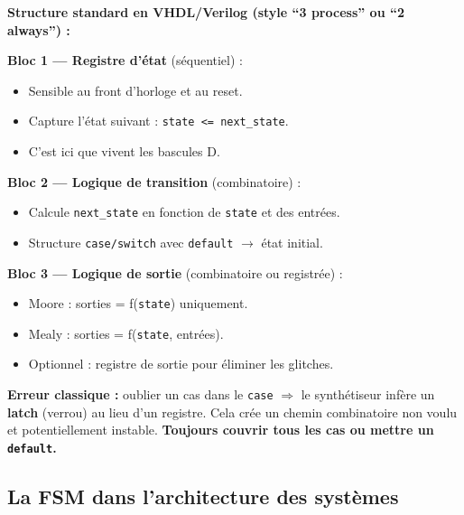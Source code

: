 \documentclass[12pt,a4paper,twoside]{book}
\begin{document}
\begin{pratique}
\textbf{Structure standard en VHDL/Verilog (style ``3 process'' ou ``2 always'') :}

\textbf{Bloc 1 --- Registre d'état} (séquentiel) :
\begin{itemize}[nosep]
\item Sensible au front d'horloge et au reset.
\item Capture l'état suivant : \texttt{state <= next\_state}.
\item C'est ici que vivent les bascules D.
\end{itemize}

\textbf{Bloc 2 --- Logique de transition} (combinatoire) :
\begin{itemize}[nosep]
\item Calcule \texttt{next\_state} en fonction de \texttt{state} et des entrées.
\item Structure \texttt{case/switch} avec \texttt{default} $\to$ état initial.
\end{itemize}

\textbf{Bloc 3 --- Logique de sortie} (combinatoire ou registrée) :
\begin{itemize}[nosep]
\item Moore : sorties = f(\texttt{state}) uniquement.
\item Mealy : sorties = f(\texttt{state}, entrées).
\item Optionnel : registre de sortie pour éliminer les glitches.
\end{itemize}

\textbf{Erreur classique :} oublier un cas dans le \texttt{case} $\Rightarrow$ le synthétiseur infère un \textbf{latch} (verrou) au lieu d'un registre. Cela crée un chemin combinatoire non voulu et potentiellement instable. \textbf{Toujours couvrir tous les cas ou mettre un \texttt{default}.}
\end{pratique}

\subsection{La FSM dans l'architecture des systèmes}
\end{document}
